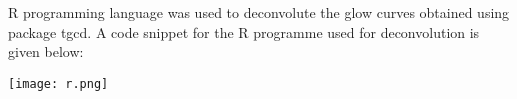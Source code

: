 \documentclass[../../Report.tex]{subfiles}
\begin{document}
        R programming language was used to deconvolute the glow curves obtained using package tgcd\cite{a16}. A code 
        snippet for the R programme used for deconvolution is given below:
        \begin{Figure}
            \centering
            \texttt{[image: r.png]}
            \label{fig:beam3}
        \end{Figure}
\end{document}
